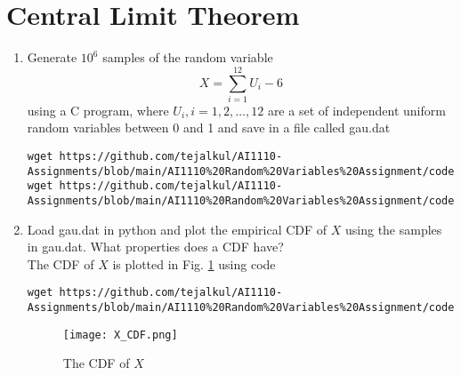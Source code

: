 \documentclass[journal,12pt,twocolumn]{IEEEtran}
\renewcommand\thesection{\arabic{section}}
\begin{document}
\section{Central Limit Theorem}
%
\begin{enumerate}[label=\thesection.\arabic*
,ref=\thesection.\theenumi]
%
\item
Generate $10^6$ samples of the random variable
%
\begin{equation}
X = \sum_{i=1}^{12}U_i -6
\end{equation}
%
using a C program, where $U_i, i = 1,2,\dots, 12$ are  a set of independent uniform random variables between 0 and 1
and save in a file called gau.dat
%
\solution

\begin{lstlisting}
wget https://github.com/tejalkul/AI1110-Assignments/blob/main/AI1110%20Random%20Variables%20Assignment/codes/exrand.c
wget https://github.com/tejalkul/AI1110-Assignments/blob/main/AI1110%20Random%20Variables%20Assignment/codes/coeffs.h
\end{lstlisting}
\item
Load gau.dat in python and plot the empirical CDF of $X$ using the samples in gau.dat. What properties does a CDF have?
\\
\solution The CDF of $X$ is plotted in Fig. \ref{fig:gauss_cdf} using code
\begin{lstlisting}
wget https://github.com/tejalkul/AI1110-Assignments/blob/main/AI1110%20Random%20Variables%20Assignment/codes/cdf_plot.py
\end{lstlisting}

\begin{figure}
\centering
\texttt{[image: X\_CDF.png]}
\caption{The CDF of $X$}
\label{fig:gauss_cdf}
\end{figure}


\end{enumerate}
\end{document}
